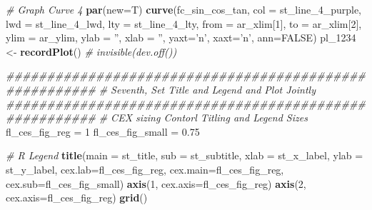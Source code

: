 \documentclass[
]{book}
\newenvironment{Shaded}{\begin{snugshade}}{\end{snugshade}}
\newcommand{\CommentTok}[1]{\textcolor[rgb]{0.56,0.35,0.01}{\textit{#1}}}
\newcommand{\DataTypeTok}[1]{\textcolor[rgb]{0.13,0.29,0.53}{#1}}
\newcommand{\DecValTok}[1]{\textcolor[rgb]{0.00,0.00,0.81}{#1}}
\newcommand{\FloatTok}[1]{\textcolor[rgb]{0.00,0.00,0.81}{#1}}
\newcommand{\KeywordTok}[1]{\textcolor[rgb]{0.13,0.29,0.53}{\textbf{#1}}}
\newcommand{\NormalTok}[1]{#1}
\newcommand{\OtherTok}[1]{\textcolor[rgb]{0.56,0.35,0.01}{#1}}
\newcommand{\StringTok}[1]{\textcolor[rgb]{0.31,0.60,0.02}{#1}}
\begin{document}
\begin{Shaded}
\begin{Highlighting}[]
\CommentTok{# Graph Curve 4}
\KeywordTok{par}\NormalTok{(}\DataTypeTok{new=}\NormalTok{T)}
\KeywordTok{curve}\NormalTok{(fc_sin_cos_tan,}
      \DataTypeTok{col =}\NormalTok{ st_line_}\DecValTok{4}\NormalTok{_purple,}
      \DataTypeTok{lwd =}\NormalTok{ st_line_}\DecValTok{4}\NormalTok{_lwd, }\DataTypeTok{lty =}\NormalTok{ st_line_}\DecValTok{4}\NormalTok{_lty,}
      \DataTypeTok{from =}\NormalTok{ ar_xlim[}\DecValTok{1}\NormalTok{], }\DataTypeTok{to =}\NormalTok{ ar_xlim[}\DecValTok{2}\NormalTok{], }\DataTypeTok{ylim =}\NormalTok{ ar_ylim,}
      \DataTypeTok{ylab =} \StringTok{''}\NormalTok{, }\DataTypeTok{xlab =} \StringTok{''}\NormalTok{, }\DataTypeTok{yaxt=}\StringTok{'n'}\NormalTok{, }\DataTypeTok{xaxt=}\StringTok{'n'}\NormalTok{, }\DataTypeTok{ann=}\OtherTok{FALSE}\NormalTok{)}
\NormalTok{pl_}\DecValTok{1234}\NormalTok{ <-}\StringTok{ }\KeywordTok{recordPlot}\NormalTok{()}
\CommentTok{# invisible(dev.off())}

\CommentTok{#######################################################}
\CommentTok{# Seventh, Set Title and Legend and Plot Jointly}
\CommentTok{#######################################################}
\CommentTok{# CEX sizing Contorl Titling and Legend Sizes}
\NormalTok{fl_ces_fig_reg =}\StringTok{ }\DecValTok{1}
\NormalTok{fl_ces_fig_small =}\StringTok{ }\FloatTok{0.75}

\CommentTok{# R Legend}
\KeywordTok{title}\NormalTok{(}\DataTypeTok{main =}\NormalTok{ st_title, }\DataTypeTok{sub =}\NormalTok{ st_subtitle, }\DataTypeTok{xlab =}\NormalTok{ st_x_label, }\DataTypeTok{ylab =}\NormalTok{ st_y_label,}
      \DataTypeTok{cex.lab=}\NormalTok{fl_ces_fig_reg,}
      \DataTypeTok{cex.main=}\NormalTok{fl_ces_fig_reg,}
      \DataTypeTok{cex.sub=}\NormalTok{fl_ces_fig_small)}
\KeywordTok{axis}\NormalTok{(}\DecValTok{1}\NormalTok{, }\DataTypeTok{cex.axis=}\NormalTok{fl_ces_fig_reg)}
\KeywordTok{axis}\NormalTok{(}\DecValTok{2}\NormalTok{, }\DataTypeTok{cex.axis=}\NormalTok{fl_ces_fig_reg)}
\KeywordTok{grid}\NormalTok{()}


\end{Highlighting}
\end{Shaded}
\end{document}
